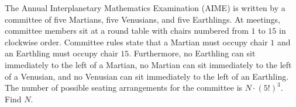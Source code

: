 The Annual Interplanetary Mathematics Examination (AIME) is written by a committee of five Martians, five Venusians, and five Earthlings. At meetings, committee members sit at a round table with chairs numbered from $ 1$ to $ 15$ in clockwise order. Committee rules state that a Martian must occupy chair $ 1$ and an Earthling must occupy chair $ 15$. Furthermore, no Earthling can sit immediately to the left of a Martian, no Martian can sit immediately to the left of a Venusian, and no Venusian can sit immediately to the left of an Earthling. The number of possible seating arrangements for the committee is $ N\cdot (5!)^3$. Find $ N$.